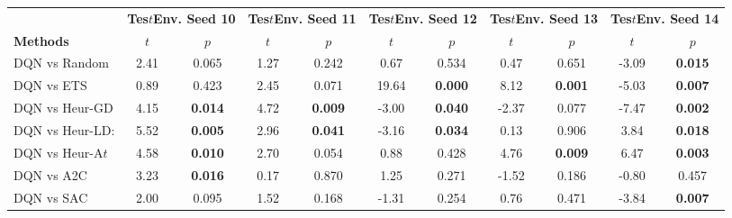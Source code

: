 \begin{tabular}{lcccccccccc}
	\toprule 
	& \multicolumn{2}{c}{\textbf{Tes$t$Env. Seed 10}} & \multicolumn{2}{c}{\textbf{Tes$t$Env. Seed 11}} & \multicolumn{2}{c}{\textbf{Tes$t$Env. Seed 12}} & \multicolumn{2}{c}{\textbf{Tes$t$Env. Seed 13}} & \multicolumn{2}{c}{\textbf{Tes$t$Env. Seed 14}} \\
	\cmidrule(lr){2-3} \cmidrule(lr){4-5} \cmidrule(lr){6-7} \cmidrule(lr){8-9} \cmidrule(lr){10-11}
	\textbf{Methods} & $t$               & $p$                          & $t$               & $p$                          & $t$               & $p$                          & $t$               & $p$                          & $t$               & $p$                          \\
	\midrule 
	DQN vs Random    & 2.41           & 0.065                  & 1.27           & 0.242                  & 0.67           & 0.534                  & 0.47           & 0.651                  & -3.09          & \textbf{0.015}         \\
	DQN vs ETS       & 0.89           & 0.423                  & 2.45           & 0.071                  & 19.64          & \textbf{0.000}         & 8.12           & \textbf{0.001}         & -5.03          & \textbf{0.007}         \\
	DQN vs Heur-GD   & 4.15           & \textbf{0.014}         & 4.72           & \textbf{0.009}         & -3.00          & \textbf{0.040}         & -2.37          & 0.077                  & -7.47          & \textbf{0.002}         \\
	DQN vs Heur-LD:  & 5.52           & \textbf{0.005}         & 2.96           & \textbf{0.041}         & -3.16          & \textbf{0.034}         & 0.13           & 0.906                  & 3.84           & \textbf{0.018}         \\
	DQN vs Heur-A$t$  & 4.58           & \textbf{0.010}         & 2.70           & 0.054                  & 0.88           & 0.428                  & 4.76           & \textbf{0.009}         & 6.47           & \textbf{0.003}         \\
	DQN vs A2C       & 3.23           & \textbf{0.016}         & 0.17           & 0.870                  & 1.25           & 0.271                  & -1.52          & 0.186                  & -0.80          & 0.457                  \\
	DQN vs SAC       & 2.00           & 0.095                  & 1.52           & 0.168                  & -1.31          & 0.254                  & 0.76           & 0.471                  & -3.84          & \textbf{0.007}         \\

\end{tabular}

